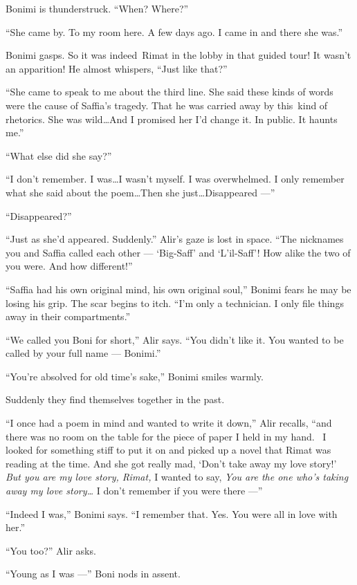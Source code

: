 \documentclass[twoside,11pt]{book}
\begin{document}
Bonimi is thunderstruck. ``When? Where?''

``She came by. To my room here. A few days ago. I came in and there she was.''

Bonimi gasps. So it was indeed~Rimat in the lobby in that guided tour! It wasn't an apparition! He almost whispers,
``Just like that?''

``She came to speak to me about the third line. She said these kinds of words were the cause of Saffia's
tragedy. That he was carried away by this~kind of{ }rhetorics. She was wild{\ldots}And I promised her
I'd change it. In public. It haunts me.''

``What else did she say?''

``I don't remember. I was{\ldots}I wasn't myself. I was overwhelmed. I only remember what she said about
the poem{\ldots}Then she just{\ldots}Disappeared ---''

``Disappeared?''

``Just as she'd appeared. Suddenly.'' Alir's gaze is lost in space. ``The
nicknames you and Saffia called each other --- `Big-Saff' and `L'il-Saff'! How alike the two of you were. And how
different!''

``Saffia had his own original mind, his own original soul,'' Bonimi fears he may be losing his
grip. The scar begins to itch. ``I'm only a technician. I only file things away in their
compartments.''

``We called you Boni for short,'' Alir says. ``You didn't like it. You wanted to
be called by your full name --- Bonimi.''

``You're absolved for old time's sake,'' Bonimi smiles warmly.

Suddenly they find themselves together in the past.

``I once had a poem in mind and wanted to write it down,'' Alir recalls, ``and
there was no room on the table for the piece of paper I held in my hand. ~I looked for something stiff to put it on and
picked up a novel that Rimat was reading at the time. And she got really mad, `Don't take away my love story!'
\textit{But you are my love story, Rimat, }I wanted to say, \textit{You are the one who's taking away my love
story{\ldots}} I don't remember if you were there ---''

``Indeed I was,'' Bonimi says. ``I remember that. Yes. You were all in love with
her.''

``You too?'' Alir asks.

``Young as I was ---'' Boni nods in assent.
\end{document}
